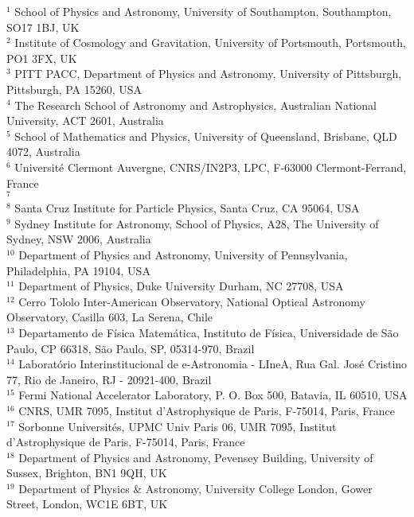 \parbox{\textwidth}{
$^{1}$ School of Physics and Astronomy, University of Southampton,  Southampton, SO17 1BJ, UK\\
$^{2}$ Institute of Cosmology and Gravitation, University of Portsmouth, Portsmouth, PO1 3FX, UK\\
$^{3}$ PITT PACC, Department of Physics and Astronomy, University of Pittsburgh, Pittsburgh, PA 15260, USA\\
$^{4}$ The Research School of Astronomy and Astrophysics, Australian National University, ACT 2601, Australia\\
$^{5}$ School of Mathematics and Physics, University of Queensland,  Brisbane, QLD 4072, Australia\\
$^{6}$ Universit\'e Clermont Auvergne, CNRS/IN2P3, LPC, F-63000 Clermont-Ferrand, France\\
$^{7}$ \\
$^{8}$ Santa Cruz Institute for Particle Physics, Santa Cruz, CA 95064, USA\\
$^{9}$ Sydney Institute for Astronomy, School of Physics, A28, The University of Sydney, NSW 2006, Australia\\
$^{10}$ Department of Physics and Astronomy, University of Pennsylvania, Philadelphia, PA 19104, USA\\
$^{11}$ Department of Physics, Duke University Durham, NC 27708, USA\\
$^{12}$ Cerro Tololo Inter-American Observatory, National Optical Astronomy Observatory, Casilla 603, La Serena, Chile\\
$^{13}$ Departamento de F\'isica Matem\'atica, Instituto de F\'isica, Universidade de S\~ao Paulo, CP 66318, S\~ao Paulo, SP, 05314-970, Brazil\\
$^{14}$ Laborat\'orio Interinstitucional de e-Astronomia - LIneA, Rua Gal. Jos\'e Cristino 77, Rio de Janeiro, RJ - 20921-400, Brazil\\
$^{15}$ Fermi National Accelerator Laboratory, P. O. Box 500, Batavia, IL 60510, USA\\
$^{16}$ CNRS, UMR 7095, Institut d'Astrophysique de Paris, F-75014, Paris, France\\
$^{17}$ Sorbonne Universit\'es, UPMC Univ Paris 06, UMR 7095, Institut d'Astrophysique de Paris, F-75014, Paris, France\\
$^{18}$ Department of Physics and Astronomy, Pevensey Building, University of Sussex, Brighton, BN1 9QH, UK\\
$^{19}$ Department of Physics \& Astronomy, University College London, Gower Street, London, WC1E 6BT, UK\\
}
